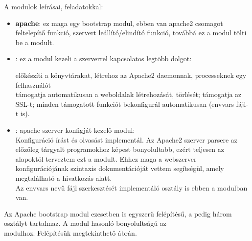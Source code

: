 A modulok leírásai, feladatokkal:
\begin{itemize}
	\item \textbf{apache}: ez maga egy bootstrap modul, ebben van apache2 csomagot feltelepítő funkció, szervert leállító/elindító funkció, továbbá ez a modul tölti be a  modult.
	\item \textbf{}: ez a modul kezeli a szerverrel kapcsolatos legtöbb dolgot:
	
	előkészíti a könyvtárakat, létrehoz az Apache2 daemonnak, processeknek egy felhasználót\\támogatja automatikusan a weboldalak létrehozását, törlését; támogatja az SSL-t; minden támogatott funkciót bekonfigurál automatikusan (envvars fájl-t is).

	\item \textbf{}: apache szerver konfigját kezelő modul:\\Konfiguráció írást és olvasást implementál. Az Apache2 szerver parsere az előzőleg tárgyalt programokhoz képest bonyolultabb, ezért teljesen az alapoktól terveztem ezt a modult. Ehhez maga a webszerver konfigurációjának szintaxis dokumentációját vettem segítségül, amely megtalálható a \cite{apache_configuring} hivatkozás alatt.
	\\Az envvars nevű fájl szerkesztését implementáló osztály is ebben a modulban van.
\end{itemize}

\pagebreak

Az Apache bootstrap modul ezesetben is egyszerű felépítésű, a  pedig három osztályt tartalmaz. A  modul hasonló bonyolultságú az \\ modulhoz. Felépítésük megtekinthető  ábrán.
	
